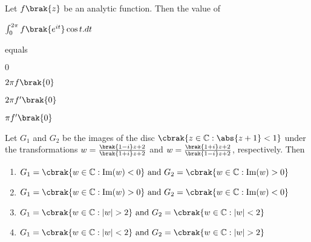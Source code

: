 \item Let  $f\brak{z}$ be an analytic function. Then the value of \begin{center} $\int_0^{2\pi} f\brak{e^{it}} \cos t .dt $ \end{center} equals
\begin{enumerate}
\begin{multicols}{2}
\item $ 0 $
\item $ 2\pi f\brak{0} $
\item $ 2\pi f^{\prime}\brak{0} $
\item $ \pi f^{\prime}\brak{0} $
\end{multicols}
\end{enumerate}
\newpage
\item Let $G_1$ and $G_2$ be the images of the disc  $\cbrak{z \in \mathbb{C} : \abs{z+1} < 1}$ under the transformations $w = \frac{\brak{1-i}z+2}{\brak{1+i}z+2}$  and $ w = \frac{\brak{1+i}z+2}{\brak{1-i}z+2}$, respectively. Then \\
\begin{enumerate}
\item $ G_1 = \cbrak{w \in \mathbb{C}: \text{Im}(w) < 0} \text{ and } G_2 = \cbrak{w \in \mathbb{C}: \text{Im}(w) > 0} $
\item $ G_1 = \cbrak{w \in \mathbb{C}: \text{Im}(w) > 0} \text{ and } G_2 = \cbrak{w \in \mathbb{C}: \text{Im}(w) < 0} $
\item $ G_1 = \cbrak{w \in \mathbb{C}: |w| > 2} \text{ and } G_2 = \cbrak{w \in \mathbb{C}: |w| < 2}  $
\item $ G_1 = \cbrak{w \in \mathbb{C}: |w| < 2} \text{ and } G_2 = \cbrak{w \in \mathbb{C}: |w| > 2} $
\end{enumerate}
    
